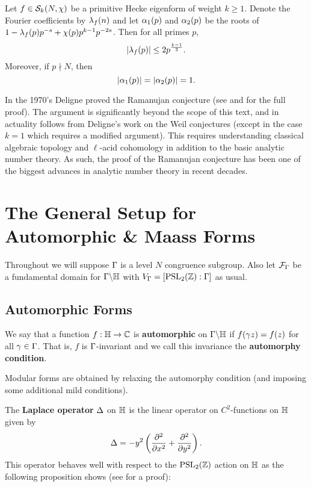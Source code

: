       \begin{theorem}
        Let $f \in \mathcal{S}_{k}(N,\chi)$ be a primitive Hecke eigenform of weight $k \ge 1$. Denote the Fourier coefficients by $\lambda_{f}(n)$ and let $\alpha_{1}(p)$ and $\alpha_{2}(p)$ be the roots of $1-\lambda_{f}(p)p^{-s}+\chi(p)p^{k-1}p^{-2s}$. Then for all primes $p$,
        \[
          |\lambda_{f}(p)| \le 2p^{\frac{k-1}{2}}.
        \]
        Moreover, if $p \nmid N$, then
        \[
          |\alpha_{1}(p)| = |\alpha_{2}(p)| = 1.
        \]
      \end{theorem}

      In the 1970's Deligne proved the Ramanujan conjecture (see \cite{deligne1971formes} and \cite{deligne1974conjecture} for the full proof). The argument is significantly beyond the scope of this text, and in actuality follows from Deligne's work on the Weil conjectures (except in the case $k = 1$ which requires a modified argument). This requires understanding classical algebraic topology and $\ell$-acid cohomology in addition to the basic analytic number theory. As such, the proof of the Ramanujan conjecture has been one of the biggest advances in analytic number theory in recent decades.
  \section{The General Setup for Automorphic \& Maass Forms}
    Throughout we will suppose $\Gamma$ is a level $N$ congruence subgroup. Also let $\mathcal{F}_{\Gamma}$ be a fundamental domain for $\Gamma\backslash\mathbb{H}$ with $V_{\Gamma} = [\mathrm{PSL}_{2}(\mathbb{Z}):\Gamma]$ as usual.
    \subsection*{Automorphic Forms}
      We say that a function $f:\mathbb{H} \to \mathbb{C}$ is \textbf{automorphic} on $\Gamma\backslash\mathbb{H}$ if $f(\gamma z) = f(z)$ for all $\gamma \in \Gamma$. That is, $f$ is $\Gamma$-invariant and we call this invariance the \textbf{automorphy condition}.

      \begin{remark}
        Modular forms are obtained by relaxing the automorphy condition (and imposing some additional mild conditions).
      \end{remark}
      
      The \textbf{Laplace operator} $\Delta$ on $\mathbb{H}$ is the linear operator on $C^{2}$-functions on $\mathbb{H}$ given by
      \[
        \Delta = -y^{2}\left(\frac{\partial^{2}}{\partial x^{2}}+\frac{\partial^{2}}{\partial y^{2}}\right).
      \]
      This operator behaves well with respect to the $\mathrm{PSL}_{2}(\mathbb{Z})$ action on $\mathbb{H}$ as the following proposition shows (see \cite{motohashi1997spectral} for a proof):

